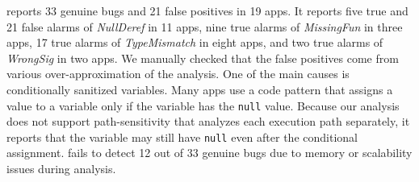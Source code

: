 \ours reports 33 genuine bugs and 21 false positives in 19 apps.
It reports five true and 21 false alarms of {\it NullDeref} in 11 apps,
nine true alarms of {\it MissingFun} in three apps,
17 true alarms of {\it TypeMismatch} in eight apps, and
two true alarms of {\it WrongSig} in two apps.
We manually checked that the false positives come from various over-approximation
of the analysis. One of the main causes is conditionally sanitized variables.  Many apps
use a code pattern that assigns a value to a variable only if the variable has
the {\tt null} value. Because our analysis does not support
path-sensitivity that analyzes each execution path separately, it reports that
the variable may still have {\tt null} even after the conditional assignment.
 \lees fails to detect 12 out of 33 genuine bugs
due to memory or scalability issues during analysis.

